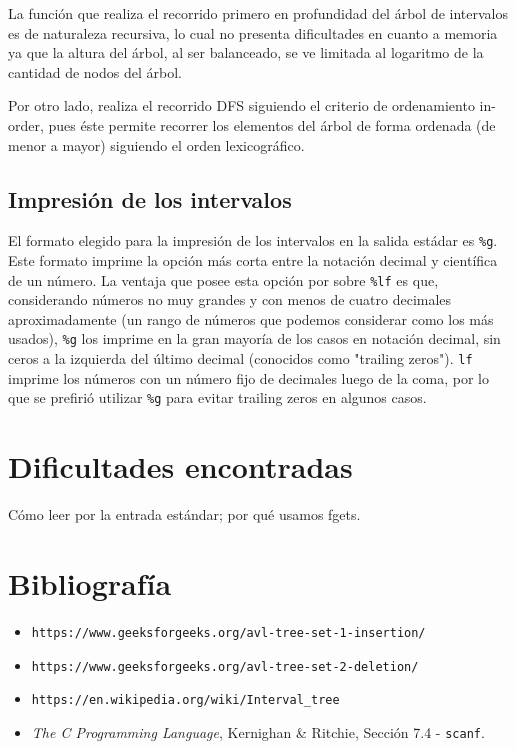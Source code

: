 \documentclass[11pt]{article}
\begin{document}
 La función que realiza el recorrido primero en profundidad del árbol de intervalos es de naturaleza recursiva, lo cual no presenta dificultades en cuanto a memoria ya que la altura del árbol, al ser balanceado, se ve limitada al logaritmo de la cantidad de nodos del árbol. \par

 Por otro lado, realiza el recorrido DFS siguiendo el criterio de ordenamiento in-order, pues éste permite recorrer los elementos del árbol de forma ordenada (de menor a mayor) siguiendo el orden lexicográfico. \par
 
 \subsection{Impresión de los intervalos}
 
 El formato elegido para la impresión de los intervalos en la salida estádar es \verb|%g|. Este formato imprime la opción más corta entre la notación decimal y científica de un número.  La ventaja que posee esta opción por sobre \verb|%lf| es que, considerando números no muy grandes y con menos de cuatro decimales aproximadamente (un rango de números que podemos considerar como los más usados), \verb|%g| los imprime en la gran mayoría de los casos en notación decimal, sin ceros a la izquierda del último decimal (conocidos como "trailing zeros"). \verb|lf| imprime los números con un número fijo de decimales luego de la coma, por lo que se prefirió utilizar \verb|%g| para evitar trailing zeros en algunos casos.
 
 \section{Dificultades encontradas}
 
 Cómo leer por la entrada estándar; por qué usamos fgets.
 
 
 
 \section{Bibliografía}
 \begin{itemize}
     \item \verb|https://www.geeksforgeeks.org/avl-tree-set-1-insertion/|
     \item \verb|https://www.geeksforgeeks.org/avl-tree-set-2-deletion/|
     \item \verb|https://en.wikipedia.org/wiki/Interval_tree|
     \item \textit{The C Programming Language}, Kernighan \& Ritchie, Sección 7.4 - \verb|scanf|.
 \end{itemize}
 
\end{document}
